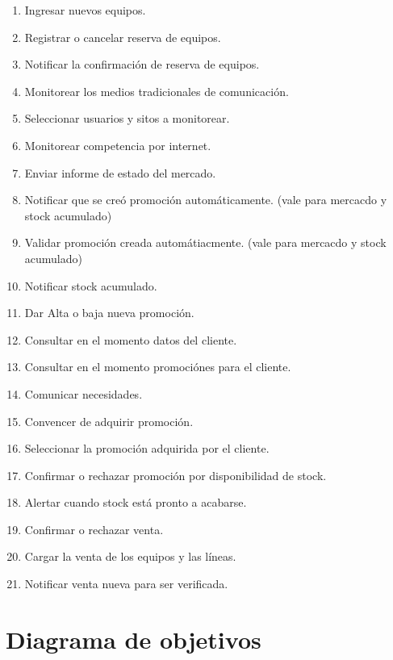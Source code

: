 \begin{enumerate}

  \item Ingresar nuevos equipos.
  \item Registrar o cancelar reserva de equipos.
  \item Notificar la confirmación de reserva de equipos.
  \item Monitorear los medios tradicionales de comunicación.
  \item Seleccionar usuarios y sitos a monitorear.
  \item Monitorear competencia por internet.
  \item Enviar informe de estado del mercado.
  \item Notificar que se creó promoción automáticamente. (vale para mercacdo y stock acumulado)
  \item Validar promoción creada automátiacmente. (vale para mercacdo y stock acumulado)
  \item Notificar stock acumulado.
  \item Dar Alta o baja nueva promoción.
  \item Consultar en el momento datos del cliente.
  \item Consultar en el momento promociónes para el cliente.
  \item Comunicar necesidades.
  \item Convencer de adquirir promoción.
  \item Seleccionar la promoción adquirida por el cliente.
  \item Confirmar o rechazar promoción por disponibilidad de stock.
  \item Alertar cuando stock está pronto a acabarse.
  \item Confirmar o rechazar venta.
  \item Cargar la venta de los equipos y las líneas.
  \item Notificar venta nueva para ser verificada.

\end{enumerate}

\clearpage

\section{Diagrama de objetivos}

